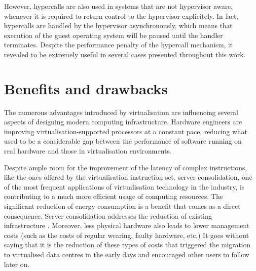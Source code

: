 However, hypercalls are also used in systems that are not hypervisor aware, whenever it is required to return control to the hypervisor explicitely. In fact, hypercalls are handled by the hypervisor asynchronously, which means that execution of the guest operating system will be paused until the handler terminates.
Despite the performance penalty of the hypercall mechanism, it revealed to be extremely useful in several cases  presented throughout this work.



\section{Benefits and drawbacks}
The numerous advantages introduced by virtualisation are influencing several aspects of designing modern computing infrastructure. Hardware engineers are improving virtualisation-supported processors at a constant pace, reducing what used to be a considerable gap between the performance of software running on real hardware and those in virtualisation environments.%

Despite ample room for the improvement of the latency of complex instructions, like the ones offered by the virtualisation instruction set, server consolidation, one of the most frequent applications of virtualisation technology in the industry, is contributing to a much more efficient usage of computing resources. The significant reduction of energy consumption is a benefit that comes as a direct consequence. Server consolidation addresses the reduction of existing infrastructure \cite{consolidation}. Moreover, less physical hardware also leads to lower management costs (such as the costs of regular wearing, faulty hardware, etc.) 
It goes without saying that it is the reduction of these types of costs that triggered the migration to virtualised data centres in the early days and encouraged other users to follow later on.%

